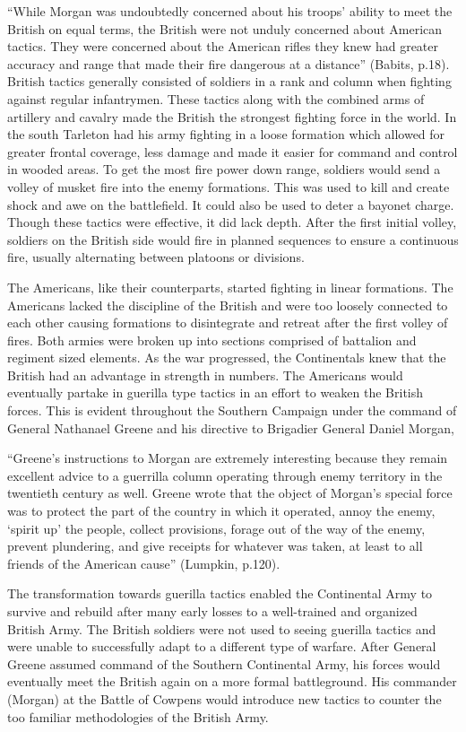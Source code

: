 “While Morgan was undoubtedly concerned about his troops’ ability to meet the
British on equal terms, the British were not unduly concerned about American
tactics. They were concerned about the American rifles they knew had greater
accuracy and range that made their fire dangerous at a distance” (Babits, p.18).
British tactics generally consisted of soldiers in a rank and column when
fighting against regular infantrymen. These tactics along with the combined arms
of artillery and cavalry made the British the strongest fighting force in the
world. In the south Tarleton had his army fighting in a loose formation which
allowed for greater frontal coverage, less damage and made it easier for command
and control in wooded areas.  To get the most fire power down range, soldiers
would send a volley of musket fire into the enemy formations.  This was used to
kill and create shock and awe on the battlefield.  It could also be used to
deter a bayonet charge. Though these tactics were effective, it did lack depth.
After the first initial volley, soldiers on the British side would fire in
planned sequences to ensure a continuous fire, usually alternating between
platoons or divisions.  

The Americans, like their counterparts, started fighting in linear formations.
The Americans lacked the discipline of the British and were too loosely
connected to each other causing formations to disintegrate and retreat after the
first volley of fires.  Both armies were broken up into sections comprised of
battalion and regiment sized elements.  As the war progressed, the Continentals
knew that the British had an advantage in strength in numbers. The Americans
would eventually partake in guerilla type tactics in an effort to weaken the
British forces.  This is evident throughout the Southern Campaign under the
command of General Nathanael Greene and his directive to Brigadier General
Daniel Morgan, 

“Greene’s instructions to Morgan are extremely interesting because they remain
excellent advice to a guerrilla column operating through enemy territory in the
twentieth century as well.  Greene wrote that the object of Morgan’s special
force was to protect the part of the country in which it operated, annoy the
enemy, ‘spirit up’ the people, collect provisions, forage out of the way of the
enemy, prevent plundering, and give receipts for whatever was taken, at least to
all friends of the American cause” (Lumpkin, p.120).

The transformation towards guerilla tactics enabled the Continental Army to
survive and rebuild after many early losses to a well-trained and organized
British Army.  The British soldiers were not used to seeing guerilla tactics and
were unable to successfully adapt to a different type of warfare.  After General
Greene assumed command of the Southern Continental Army, his forces would
eventually meet the British again on a more formal battleground.  His commander
(Morgan) at the Battle of Cowpens would introduce new tactics to counter the too
familiar methodologies of the British Army.  

